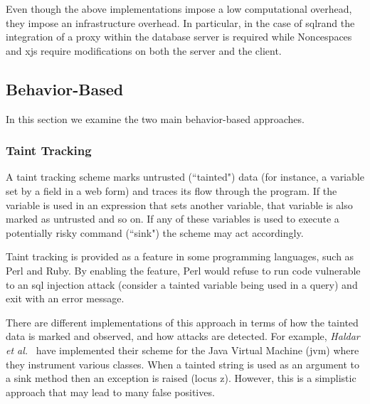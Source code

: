 \documentclass[conference]{IEEEtran}
\begin{document}
Even though the above implementations impose a low
computational overhead, they impose an infrastructure
overhead. In particular, in the case of {\sc sql}rand
the integration of a proxy within the database server
is required while Noncespaces and x{\sc js} require
modifications on both the server and the client.

\subsection{Behavior-Based}

In this section we examine the two main behavior-based
approaches.

\subsubsection{Taint Tracking}
\label{sec:taint}

A taint tracking scheme marks untrusted
(``tainted") data (for instance, a variable set
by a field in a web form) and traces its flow through
the program. If the variable is used in an expression
that sets another variable, that variable is also
marked as untrusted and so on. If any of these variables
is used to execute a potentially risky command (``sink") the
scheme may act accordingly.

Taint tracking is provided as a feature in some
programming languages, such as Perl and Ruby.
By enabling the feature, Perl would refuse to run code
vulnerable to an {\sc sql} injection attack
(consider a tainted variable being used in a query)
and exit with an error message.

There are different implementations of this approach
in terms of how the tainted data is marked and observed,
and how attacks are detected.
For example, {\it Haldar et al.}~\cite{HCF05} have implemented
their scheme for the Java Virtual Machine ({\sc jvm})
where they instrument various classes. When a
tainted string is used as an argument to a sink method
then an exception is raised (locus {\sc z}).
However, this is a simplistic approach that may
lead to many false positives.
\end{document}
